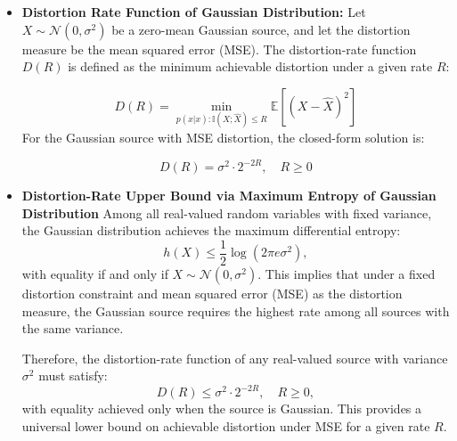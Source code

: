 \documentclass[11pt]{article}
\theoremstyle{plain}
\theoremstyle{definition}
\begin{document}
\begin{itemize}

    \item \textbf{Distortion Rate Function of Gaussian Distribution:}
    Let $X \sim \mathcal{N}(0, \sigma^2)$ be a zero-mean Gaussian source, and let the distortion measure be the mean squared error (MSE).
The distortion-rate function $D(R)$ is defined as the minimum achievable distortion under a given rate $R$:

\[
D(R) = \min_{p(\hat{x}|x): \mathbb{I}(X; \hat{X}) \leq R} \mathbb{E}[(X - \hat{X})^2]
\]
For the Gaussian source with MSE distortion, the closed-form solution is:

\[
D(R) = \sigma^2 \cdot 2^{-2R}, \quad R \geq 0
\]
\item \textbf{Distortion-Rate Upper Bound via Maximum Entropy of Gaussian Distribution}  
Among all real-valued random variables with fixed variance, the Gaussian distribution achieves the maximum differential entropy:
\[
h(X) \leq \frac{1}{2} \log(2\pi e \sigma^2),
\]
with equality if and only if \( X \sim \mathcal{N}(0, \sigma^2) \). This implies that under a fixed distortion constraint and mean squared error (MSE) as the distortion measure, the Gaussian source requires the highest rate among all sources with the same variance.

Therefore, the distortion-rate function of any real-valued source with variance \( \sigma^2 \) must satisfy:
\[
D(R) \leq \sigma^2 \cdot 2^{-2R}, \quad R \geq 0,
\]
with equality achieved only when the source is Gaussian. This provides a universal lower bound on achievable distortion under MSE for a given rate \( R \).




\end{itemize}
\end{document}
